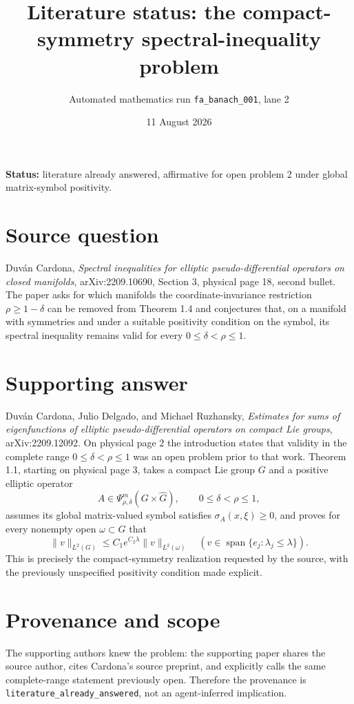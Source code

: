 \documentclass[11pt]{article}
\title{Literature status: the compact-symmetry spectral-inequality problem}
\author{Automated mathematics run \texttt{fa\_banach\_001}, lane 2}
\date{11 August 2026}
\begin{document}
\maketitle

\noindent\textbf{Status:} literature already answered, affirmative for open
problem 2 under global matrix-symbol positivity.

\section*{Source question}
Duván Cardona, \emph{Spectral inequalities for elliptic
pseudo-differential operators on closed manifolds}, arXiv:2209.10690,
Section 3, physical page 18, second bullet.  The paper asks for which
manifolds the coordinate-invariance restriction $\rho\geq1-\delta$ can be
removed from Theorem 1.4 and conjectures that, on a manifold with symmetries
and under a suitable positivity condition on the symbol, its spectral
inequality remains valid for every $0\leq\delta<\rho\leq1$.

\section*{Supporting answer}
Duván Cardona, Julio Delgado, and Michael Ruzhansky,
\emph{Estimates for sums of eigenfunctions of elliptic pseudo-differential
operators on compact Lie groups}, arXiv:2209.12092.  On physical page 2 the
introduction states that validity in the complete range
$0\leq\delta<\rho\leq1$ was an open problem prior to that work.  Theorem 1.1,
starting on physical page 3, takes a compact Lie group $G$ and a positive
elliptic operator
\[
 A\in\Psi^m_{\rho,\delta}(G\times\widehat G),\qquad
 0\leq\delta<\rho\leq1,
\]
assumes its global matrix-valued symbol satisfies
$\sigma_A(x,\xi)\geq0$, and proves for every nonempty open
$\omega\subset G$ that
\[
 \|v\|_{L^2(G)}\leq C_1e^{C_2\lambda}\|v\|_{L^2(\omega)}
 \quad
 (v\in\operatorname{span}\{e_j:\lambda_j\leq\lambda\}).
\]
This is precisely the compact-symmetry realization requested by the source,
with the previously unspecified positivity condition made explicit.

\section*{Provenance and scope}
The supporting authors knew the problem: the supporting paper shares the
source author, cites Cardona's source preprint, and explicitly calls the same
complete-range statement previously open.  Therefore the provenance is
\texttt{literature\_already\_answered}, not an agent-inferred implication.
\end{document}
